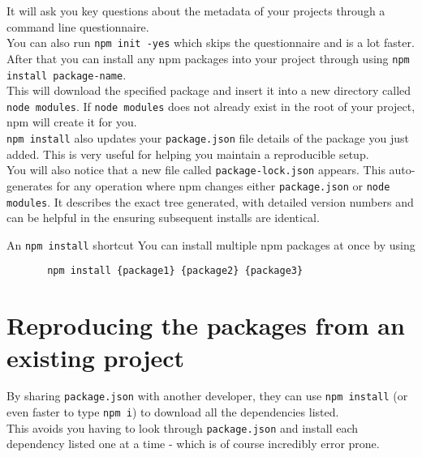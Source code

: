 It will ask you key questions about the metadata of your projects through a command line questionnaire.
\\

You can also run \texttt{npm init -yes} which skips the questionnaire and is a lot faster.
\\

After that you can install any npm packages into your project through using \texttt{npm install package-name}.
\\

This will download the specified package and insert it into a new directory called \texttt{node modules}. If \texttt{node modules} does not already exist in the root of your project, npm will create it for you.
\\

\texttt{npm install} also updates your \texttt{package.json} file details of the package you just added. This is very useful for helping you maintain a reproducible setup.
\\

You will also notice that a new file called \texttt{package-lock.json} appears. This auto-generates for any operation where npm changes either \texttt{package.json} or \texttt{node modules}. It describes the exact tree generated, with detailed version numbers and can be helpful in the ensuring subsequent installs are identical. 
\\

\begin{infobox}{An \texttt{npm install} shortcut}
	You can install multiple npm packages at once by using 
	
	\begin{verbatim}
       npm install {package1} {package2} {package3}
	\end{verbatim}
\end{infobox}


\section{Reproducing the packages from an existing project}

By sharing \texttt{package.json} with another developer, they can use \texttt{npm install} (or even faster to type \texttt{npm i}) to download all the dependencies listed.   
\\

This avoids you having to look through \texttt{package.json} and install each dependency listed one at a time - which is of course incredibly error prone.


